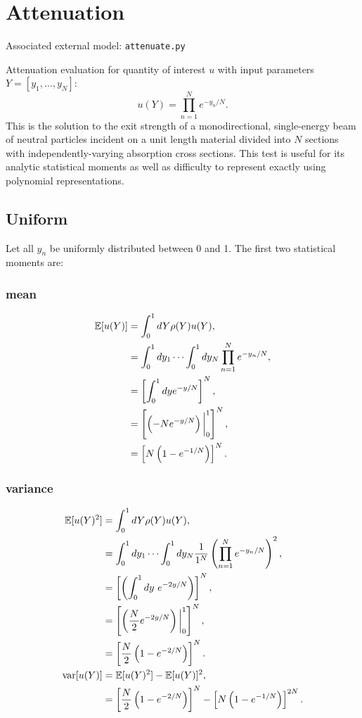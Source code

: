 \section{Attenuation}
Associated external model: \texttt{attenuate.py}

Attenuation evaluation for quantity of interest $u$ with input parameters $Y=[y_1,\ldots,y_N]$:
\begin{equation}
u(Y) = \prod_{n=1}^N e^{-y_n/N}.
\end{equation}
This is the solution to the exit strength of a monodirectional, single-energy beam of neutral particles
incident on a unit length material divided into $N$ sections with independently-varying absorption cross
sections.  This test is useful for its analytic statistical moments as well as difficulty to represent 
exactly using polynomial representations.

\subsection{Uniform}
Let all $y_n$ be uniformly distributed between 0 and 1.  The first two statistical moments are:
\subsubsection{mean}
\begin{align}
\mathbb{E}[ u(Y)] &=\int_{0}^1 dY \rho(Y)u(Y),\\
  &=\int_{0}^1 dy_1\cdots\int_{0}^1 dy_N \prod_{n=1}^N e^{-y_n/N},\\
  &=\left[ \int_{0}^1 dy e^{-y/N}\right]^N,\\
  &=\left[\left(-Ne^{-y/N}\right)\bigg|_0^1\right]^N,\\
  &=\left[N\left(1-e^{-1/N}\right)\right]^N.
\end{align}
\subsubsection{variance}
\begin{align}
\mathbb{E}[ u(Y)^2] &= \int_{0}^1 dY \rho(Y)u(Y),\\
  &=\int_{0}^1 dy_1\cdots\int_{0}^1 dy_N \frac{1}{1^N} \left(\prod_{n=1}^N e^{-y_n/N}\right)^2,\\
  &=\left[\left(\int_{0}^1 dy\ e^{-2y/N} \right)\right]^N,\\
  &=\left[\left(\frac{N}{2}e^{-2y/N} \right)\bigg|_{0}^1 \right]^N,\\
  &=\left[\frac{N}{2}\left(1-e^{-2/N}\right)\right]^N.\\
\text{var}[u(Y)] &= \mathbb{E}[ u(Y)^2]-\mathbb{E}[ u(Y)]^2,\\
  &= \left[\frac{N}{2}\left(1-e^{-2/N}\right)\right]^N - \left[N\left(1-e^{-1/N}\right)\right]^{2N}.
\end{align}
